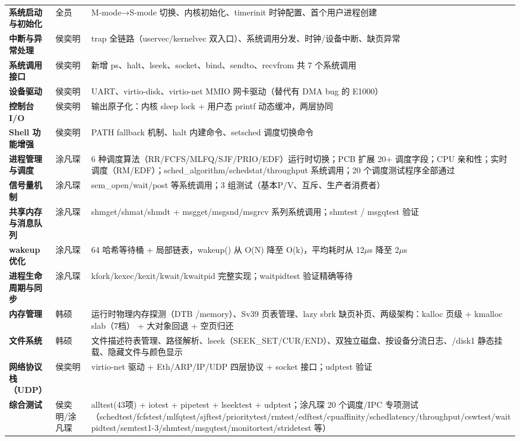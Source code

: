 \documentclass[12pt,a4paper]{ctexart}
\begin{document}
\begin{table}[H]
\begin{tabular}{>{\bfseries}p{2.5cm}p{2.2cm}p{8.8cm}}
系统启动与初始化   & 全员   & M-mode→S-mode 切换、内核初始化、timerinit 时钟配置、首个用户进程创建 \\
中断与异常处理     & 侯奕明 & trap 全链路（uservec/kernelvec 双入口）、系统调用分发、时钟/设备中断、缺页异常 \\
系统调用接口       & 侯奕明 & 新增 ps、halt、lseek、socket、bind、sendto、recvfrom 共 7 个系统调用 \\
设备驱动           & 侯奕明 & UART、virtio-disk、virtio-net MMIO 网卡驱动（替代有 DMA bug 的 E1000） \\
控制台 I/O         & 侯奕明 & 输出原子化：内核 sleep lock + 用户态 printf 动态缓冲，两层协同 \\
Shell 功能增强     & 侯奕明 & PATH fallback 机制、halt 内建命令、setsched 调度切换命令 \\
进程管理与调度     & 涂凡琛 & 6 种调度算法（RR/FCFS/MLFQ/SJF/PRIO/EDF）运行时切换；PCB 扩展 20+ 调度字段；CPU 亲和性；实时调度（RM/EDF）；sched\_algorithm/schedstat/throughput 系统调用；20 个调度测试程序全部通过 \\
信号量机制         & 涂凡琛 & sem\_open/wait/post 等系统调用；3 组测试（基本P/V、互斥、生产者消费者） \\
共享内存与消息队列 & 涂凡琛 & shmget/shmat/shmdt + msgget/msgsnd/msgrcv 系列系统调用；shmtest / msgqtest 验证 \\
wakeup 优化        & 涂凡琛 & 64 哈希等待桶 + 局部链表，wakeup() 从 O(N) 降至 O(k)，平均耗时从 12$\mu$s 降至 2$\mu$s \\
进程生命周期与同步 & 涂凡琛 & kfork/kexec/kexit/kwait/kwaitpid 完整实现；waitpidtest 验证精确等待 \\
内存管理           & 韩硕   & 运行时物理内存探测（DTB /memory）、Sv39 页表管理、lazy sbrk 缺页补页、两级架构：kalloc 页级 + kmalloc slab（7档） + 大对象回退 + 空页归还 \\
文件系统           & 韩硕   & 文件描述符表管理、路径解析、lseek（SEEK\_SET/CUR/END）、双独立磁盘、按设备分流日志、/disk1 静态挂载、隐藏文件与颜色显示 \\
网络协议栈（UDP）  & 侯奕明 & virtio-net 驱动 + Eth/ARP/IP/UDP 四层协议 + socket 接口；udptest 验证 \\
综合测试           & 侯奕明/涂凡琛 & alltest(43项) + iotest + pipetest + lseektest + udptest；涂凡琛 20 个调度/IPC 专项测试（schedtest/fcfstest/mlfqtest/sjftest/prioritytest/rmtest/edftest/cpuaffinity/schedlatency/throughput/cswtest/waitpidtest/semtest1-3/shmtest/msgqtest/monitortest/stridetest 等） \\
\bottomrule
\end{tabular}
\end{table}
\end{document}
